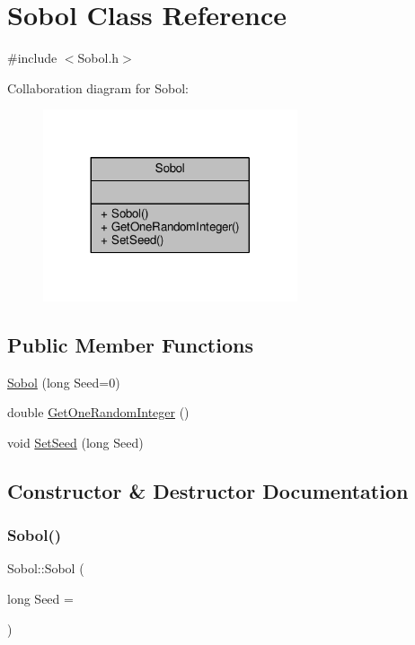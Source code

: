 \hypertarget{classSobol}{}\section{Sobol Class Reference}
\label{classSobol}


{\ttfamily \#include $<$Sobol.\+h$>$}



Collaboration diagram for Sobol\+:
\nopagebreak
\begin{figure}[H]
\begin{center}
\leavevmode
\includegraphics[width=212pt]{classSobol__coll__graph}
\end{center}
\end{figure}
\subsection*{Public Member Functions}
\begin{DoxyCompactItemize}
\item 
\hyperlink{classSobol_a5f42dff3865f0d7918fd7dbd2e7235f6}{Sobol} (long Seed=0)
\item 
double \hyperlink{classSobol_a86bc0fffe47e5e6f358b28224ad875f9}{Get\+One\+Random\+Integer} ()
\item 
void \hyperlink{classSobol_aa1207baa1ee71477435ff23ecaac84f2}{Set\+Seed} (long Seed)
\end{DoxyCompactItemize}


\subsection{Constructor \& Destructor Documentation}
\hypertarget{classSobol_a5f42dff3865f0d7918fd7dbd2e7235f6}{}\label{classSobol_a5f42dff3865f0d7918fd7dbd2e7235f6} 
\subsubsection{\texorpdfstring{Sobol()}{Sobol()}}
{\footnotesize\ttfamily Sobol\+::\+Sobol (\begin{DoxyParamCaption}\item[{long}]{Seed = {} }\end{DoxyParamCaption})}



